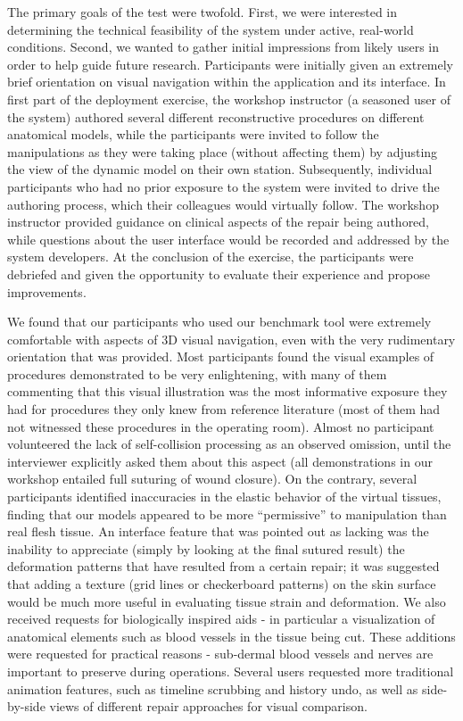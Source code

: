 The primary goals of the test were twofold. First, we were interested
in determining the technical feasibility of the system under active,
real-world conditions. Second, we wanted to gather initial impressions
from likely users in order to help guide future research. Participants
were initially given an extremely brief orientation on visual
navigation within the application and its interface. In first part of
the deployment exercise, the workshop instructor (a seasoned user of
the system) authored several different reconstructive procedures on
different anatomical models, while the participants were invited to
follow the manipulations as they were taking place (without affecting
them) by adjusting the view of the dynamic model on their own
station. Subsequently, individual participants who had no prior
exposure to the system were invited to drive the authoring process,
which their colleagues would virtually follow. The workshop instructor
provided guidance on clinical aspects of the repair being authored,
while questions about the user interface would be recorded and
addressed by the system developers. At the conclusion of the exercise,
the participants were debriefed and given the opportunity to evaluate
their experience and propose improvements.

We found that our participants who used our benchmark tool were
extremely comfortable with aspects of 3D visual navigation, even with
the very rudimentary orientation that was provided. Most participants
found the visual examples of procedures demonstrated to be very
enlightening, with many of them commenting that this visual
illustration was the most informative exposure they had for procedures
they only knew from reference literature (most of them had not
witnessed these procedures in the operating room). Almost no
participant volunteered the lack of self-collision processing as an
observed omission, until the interviewer explicitly asked them about
this aspect (all demonstrations in our workshop entailed full suturing
of wound closure). On the contrary, several participants identified
inaccuracies in the elastic behavior of the virtual tissues, finding
that our models appeared to be more ``permissive'' to manipulation
than real flesh tissue. An interface feature that was pointed out as
lacking was the inability to appreciate (simply by looking at the
final sutured result) the deformation patterns that have resulted from
a certain repair; it was suggested that adding a texture (grid lines
or checkerboard patterns) on the skin surface would be much more
useful in evaluating tissue strain and deformation. We also received
requests for biologically inspired aids - in particular a
visualization of anatomical elements such as blood vessels in the
tissue being cut. These additions were requested for practical reasons
- sub-dermal blood vessels and nerves are important to preserve during
operations. Several users requested more traditional animation
features, such as timeline scrubbing and history undo, as well as
side-by-side views of different repair approaches for visual
comparison.

 
